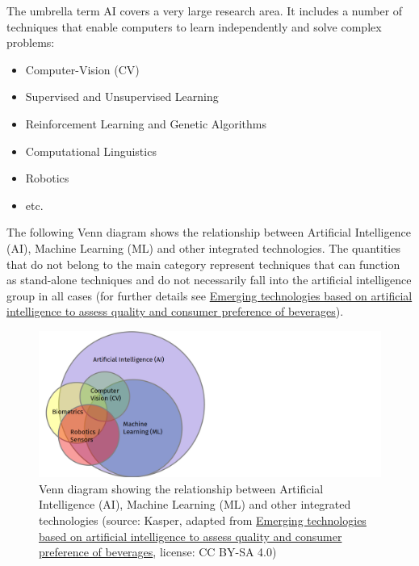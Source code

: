 \documentclass [oneside,10pt,a4paper,ngerman,BCOR10mm,headsepline,parindent,final]{scrartcl}
\providecommand{\tightlist}{%
      \setlength{\itemsep}{0pt}\setlength{\parskip}{0pt}}
\begin{document}
The umbrella term AI covers a very large research area. It includes a
number of techniques that enable computers to learn independently and
solve complex problems:

\begin{itemize}
\tightlist
\item
  Computer-Vision (CV)
\item
  Supervised and Unsupervised Learning
\item
  Reinforcement Learning and Genetic Algorithms
\item
  Computational Linguistics
\item
  Robotics
\item
  etc.
\end{itemize}

The following Venn diagram shows the relationship between Artificial
Intelligence (AI), Machine Learning (ML) and other integrated
technologies. The quantities that do not belong to the main category
represent techniques that can function as stand-alone techniques and do
not necessarily fall into the artificial intelligence group in all cases
(for further details see
\href{https://www.researchgate.net/publication/336375517_Emerging_technologies_based_on_artificial_intelligence_to_assess_quality_and_consumer_preference_of_beverages}{Emerging
technologies based on artificial intelligence to assess quality and
consumer preference of beverages}).

    \begin{figure}
\centering
\includegraphics{images/AI_ML_venn_diagram_wide.png}
\caption{Venn diagram showing the relationship between Artificial
Intelligence (AI), Machine Learning (ML) and other integrated
technologies (source: Kasper, adapted from
\href{https://www.researchgate.net/publication/336375517_Emerging_technologies_based_on_artificial_intelligence_to_assess_quality_and_consumer_preference_of_beverages}{Emerging
technologies based on artificial intelligence to assess quality and
consumer preference of beverages}, license: CC BY-SA 4.0)}
\end{figure}
\end{document}
